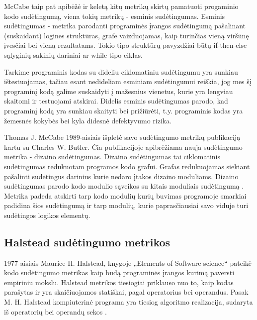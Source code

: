 \documentclass{VUMIFPSbakalaurinis}
\begin{document}
McCabe taip pat apibėžė ir keletą kitų metrikų skirtų pamatuoti progaminio kodo sudėtingumą, viena tokių metrikų - esminis sudėtingumas. Esminis sudėtingumas - metrika parodanti programinės įrangos sudėtingumą pašalinant (suskaidant) logines struktūras, grafe vaizduojamas, kaip turinčias vieną viršūnę įvesčiai bei vieną rezultatams. Tokio tipo struktūrų pavyzdžiai būtų if-then-else sąlyginių sakinių dariniai ar while tipo ciklas.

Tarkime programinis kodas su dideliu ciklomatiniu sudėtingumu yra sunkiau ištestuojamas, tačiau esant nedideliam esminiam sudėtingumui reiškia, jog mes šį programinį kodą galime suskaidyti į mažesnius vienetus, kurie yra lengviau skaitomi ir testuojami atskirai. Didelis esminis sudėtingumas parodo, kad programinį kodą yra sunkiau skaityti bei prižiūrėti, t.y. programinis kodas yra žemesnės kokybės bei kyla didesnė defektyvumo rizika.

Thomas J. McCabe 1989-aisiais išpletė savo sudėtingumo metrikų publikaciją kartu su Charles W. Butler. Čia publikacijoje apibrėžiama nauja sudėtingumo metrika - dizaino sudėtingumas. Dizaino sudėtingumas tai ciklomatinis sudėtingumas redukuotam programos kodo grafui. Grafas redukuojamas siekiant pašalinti sudėtingus darinius kurie nedaro įtakos dizaino moduliams. Dizaino sudėtingumas parodo kodo modulio sąveikos su kitais moduliais sudėtingumą \cite{McCabe:1989:DCM:76380.76382}. Metrika padeda atskirti tarp kodo modulių kurių buvimas programoje smarkiai padidina šios sudėtingumą ir tarp modulių, kurie paprasčiausiai savo viduje turi sudėtingos logikos elementų.

\subsection{Halstead sudėtingumo metrikos}
1977-aisiais Maurice H. Halstead, knygoje „Elements of Software science“ pateikė kodo sudėtingumo metrikas kaip būdą programinės įrangos kūrimą paversti empiriniu mokslu. Halstead metrikos tiesiogiai priklauso nuo to, kaip kodas parašytas ir yra skaičiuojamos statiškai, pagal operatorius bei operandus. Pasak M. H. Halstead kompiuterinė programa yra tiesiog algoritmo realizacija, sudaryta iš operatorių bei operandų sekos \cite{Halstead:1977:ESS:540137}.
\end{document}
